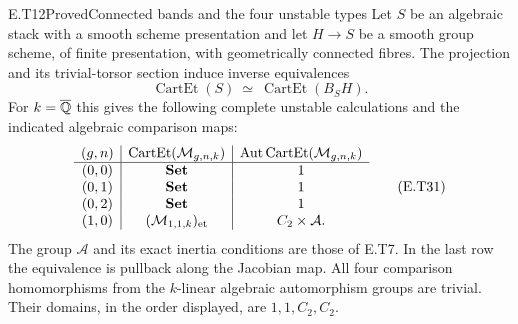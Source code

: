 \begin{result}{E.T12}{Proved}{Connected bands and the four unstable types}
Let $S$ be an algebraic stack with a smooth scheme presentation
and let $H\to S$ be a smooth group scheme, of finite presentation,
with geometrically connected fibres.  The projection and its
trivial-torsor section induce inverse equivalences
\[
 \operatorname{CartEt}(S)
       \ \simeq\ \operatorname{CartEt}(B_S H).                \tag{E.T30}
\]
For $k=\overline{\mathbb Q}$ this gives the following complete unstable
calculations and the indicated algebraic comparison maps:
\[
\begin{array}{c|c|c}
 (g,n)&\operatorname{CartEt}(\mathcal M_{g,n,k})
 &\operatorname{Aut}\operatorname{CartEt}(\mathcal M_{g,n,k})
 \\ \hline
 (0,0)&\mathbf{Set}&1\\
 (0,1)&\mathbf{Set}&1\\
 (0,2)&\mathbf{Set}&1\\
 (1,0)&(\mathcal M_{1,1,k})_{\mathrm{et}}&C_2\times\mathcal A.
\end{array}                                                   \tag{E.T31}
\]
The group $\mathcal A$ and its exact inertia conditions are
those of E.T7.  In the last row the equivalence is pullback
along the Jacobian map.  All four comparison homomorphisms
from the $k$-linear algebraic automorphism groups are trivial.
Their domains, in the order displayed, are $1,1,C_2,C_2$.
\end{result}
